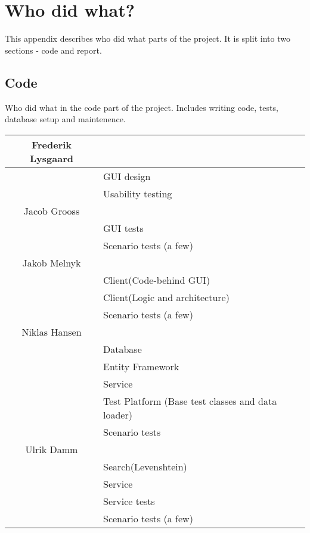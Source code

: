 \chapter{Who did what?}
\label{Appendix_Who}
This appendix describes who did what parts of the project. It is split into two sections - code and report.
\section{Code}
\label{Appendix_Who}
Who did what in the code part of the project. Includes writing code, tests, database setup and maintenence.
\begin{longtable}{| c | p{9cm} |}
\hline
Frederik Lysgaard & \\
\hline
& GUI design\\
\hline
& Usability testing\\
\hline
Jacob Grooss & \\
\hline
& GUI tests\\
\hline
& Scenario tests (a few)\\
\hline
Jakob Melnyk & \\
\hline
& Client(Code-behind GUI)\\
\hline
& Client(Logic and architecture)\\
\hline
& Scenario tests (a few)\\
\hline
Niklas Hansen & \\
\hline
& Database\\
\hline
& Entity Framework\\
\hline 
& Service\\
\hline
& Test Platform (Base test classes and data loader)\\
\hline
& Scenario tests\\
\hline
Ulrik Damm & \\
\hline
& Search(Levenshtein)\\
\hline
& Service\\
\hline
& Service tests\\
\hline
& Scenario tests (a few)\\
\hline
\end{longtable}

